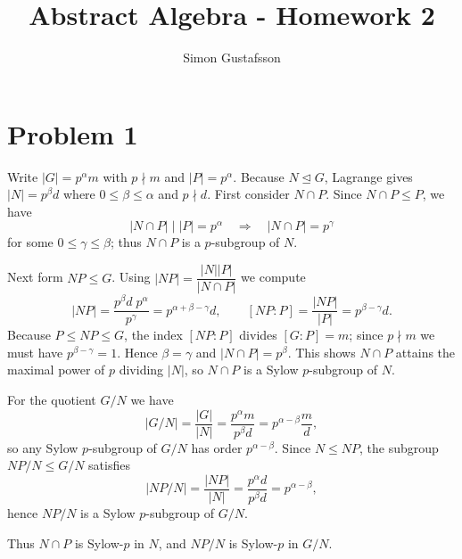 \documentclass[12pt]{article}
\title{Abstract Algebra - Homework 2}
\author{Simon Gustafsson}
\date{}
\begin{document}
\maketitle

\section*{Problem 1}

Write \(|G| = p^{\alpha}m\) with \(p\nmid m\) and \(|P|=p^{\alpha}\).  
Because \(N\trianglelefteq G\), Lagrange gives \(|N|=p^{\beta}d\) where \(0\le\beta\le\alpha\) and \(p\nmid d\). First consider \(N\cap P\).  Since \(N\cap P\le P\), we have
\[
|N\cap P|\mid |P|=p^{\alpha}\quad\Longrightarrow\quad|N\cap P|=p^{\gamma}
\]
for some \(0\le\gamma\le\beta\); thus \(N\cap P\) is a \(p\)-subgroup of \(N\).

Next form \(NP\le G\).  Using \(|NP|=\dfrac{|N||P|}{|N\cap P|}\) we compute
\[
|NP|=\frac{p^{\beta}d\;p^{\alpha}}{p^{\gamma}}=p^{\alpha+\beta-\gamma}d,
\qquad
[NP:P]=\frac{|NP|}{|P|}=p^{\beta-\gamma}d .
\]
Because \(P\le NP\le G\), the index \([NP:P]\) divides \([G:P]=m\); since \(p\nmid m\) we must have \(p^{\beta-\gamma}=1\).  Hence \(\beta=\gamma\) and \( |N\cap P|=p^{\beta}\).  This shows \(N\cap P\) attains the maximal power of \(p\) dividing \(|N|\), so \(N\cap P\) is a Sylow \(p\)-subgroup of \(N\).

For the quotient \(G/N\) we have
\[
|G/N|=\frac{|G|}{|N|}=\frac{p^{\alpha}m}{p^{\beta}d}=p^{\alpha-\beta}\frac{m}{d},
\]
so any Sylow \(p\)-subgroup of \(G/N\) has order \(p^{\alpha-\beta}\).
Since \(N\le NP\), the subgroup \(NP/N\le G/N\) satisfies
\[
|NP/N|=\frac{|NP|}{|N|}=\frac{p^{\alpha}d}{p^{\beta}d}=p^{\alpha-\beta},
\]
hence \(NP/N\) is a Sylow \(p\)-subgroup of \(G/N\).

Thus \(N\cap P\) is Sylow-\(p\) in \(N\), and \(NP/N\) is Sylow-\(p\) in \(G/N\).
\end{document}
